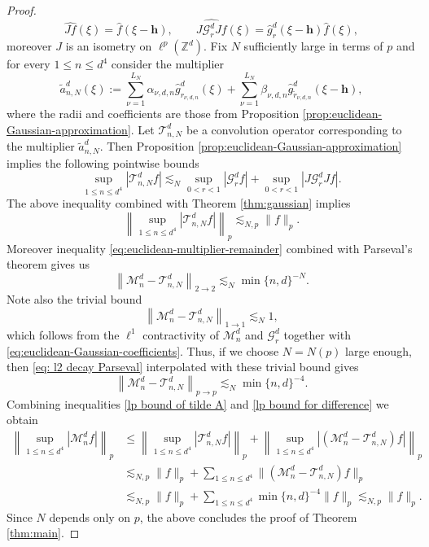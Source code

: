 \documentclass{article}
\theoremstyle{plain}
\numberwithin{equation}{section}
\begin{document}
\begin{proof}
\begin{equation*}
    \widehat{Jf}(\xi)=\widehat{f}(\xi-\mathbf h), \qquad \widehat{J \mathcal G_r^dJf}(\xi)=\widehat{g}_r^d(\xi-\mathbf h)\widehat{f}(\xi),
\end{equation*}
moreover $J$ is an isometry on $\ell^p(\mathbb Z^d)$.
Fix $N$ sufficiently large in terms of $p$ and for every $1 \le n \le d^4$ consider the multiplier 
\begin{equation*}
 \tilde{a}_{n,N}^d(\xi)
 :=\sum_{\nu=1}^{L_N}\alpha_{\nu,d,n}\widehat g_{r_{\nu,d,n}}^d(\xi)
 +\sum_{\nu=1}^{L_N}\beta_{\nu,d,n}
 \widehat g_{\widetilde r_{\nu,d,n}}^d(\xi-\mathbf h),
\end{equation*}
where the radii and coefficients are those from Proposition \ref{prop:euclidean-Gaussian-approximation}. Let $\mathcal{T}_{n,N}^d$ be a convolution operator corresponding to the multiplier $\tilde{a}_{n,N}^d$. Then Proposition \ref{prop:euclidean-Gaussian-approximation} implies the following pointwise bounds 
\[
\sup_{1\leq n\leq d^4}|\mathcal T_{n,N}^df|
 \lesssim_{N} 
  \sup_{0<r<1}|\mathcal G_r^df|
  +\sup_{0<r<1}|J\mathcal G_r^dJf|.
\]
The above inequality combined with
Theorem \ref{thm:gaussian} implies
\begin{equation} \label{lp bound of tilde A}
    \left\|\sup_{1\leq n\leq d^4}|\mathcal T_{n,N}^d f| \right\|_{p } \lesssim_{N,p} \|f\|_p.
\end{equation}
Moreover inequality \eqref{eq:euclidean-multiplier-remainder} combined with Parseval's theorem gives us 
\begin{equation}
\label{eq: l2 decay Parseval}
    \left\|\mathcal{M}_{n}^d-\mathcal T_{n,N}^d  \right\|_{2\to 2 } \lesssim_{N}  \min\{n,d\}^{-N}.
\end{equation}
Note also the trivial bound
\[
 \left\|\mathcal{M}_{n}^d-\mathcal T_{n,N}^d  \right\|_{1\to 1 } \lesssim_{N} 1,
\]
which follows from the $\ell^1$ contractivity of $\mathcal{M}_{n}^d$ and $ \mathcal G_r^d$ together with \eqref{eq:euclidean-Gaussian-coefficients}. Thus, if we choose $N=N(p)$ large enough, then \eqref{eq: l2 decay Parseval} interpolated with these trivial bound gives
\begin{equation} \label{lp bound for difference}
\left\|\mathcal{M}_{n}^d-\mathcal T_{n,N}^d \right\|_{p\to p } \lesssim_{N}  \min\{n,d\}^{-4}.
\end{equation}
Combining inequalities \eqref{lp bound of tilde A} and \eqref{lp bound for difference} we obtain
\begin{align*}
    \left\|\sup_{1\leq n\leq d^4}|\mathcal M_n^d f|\right\|_{p}
 &\le \left\|\sup_{1\leq n\leq d^4}|\mathcal T_{n,N}^d f| \right\|_{p} + \left\|\sup_{1\leq n\leq d^4}|(\mathcal M_{n}^d-\mathcal T_{n,N}^d)f| \right\|_{p} \\
 &\lesssim_{N,p}\|f\|_p+ \sum_{1 \le n \le d^4}\|(\mathcal M_{n}^d-\mathcal T_{n,N}^d)f\|_p \\
 &\lesssim_{N,p}\|f\|_p+ \sum_{1 \le n \le d^4} \min\{n,d \}^{-4}\|f\|_p \lesssim_{N,p} \|f\|_p.
\end{align*}
Since $N$ depends only on $p$, the above concludes the proof of Theorem \ref{thm:main}.

\end{proof}
\end{document}
